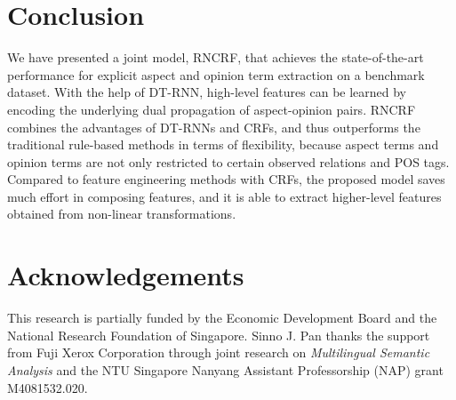 \documentclass[11pt,letterpaper]{article}
\begin{document}
\section{Conclusion}
We have presented a joint model, RNCRF, that achieves the state-of-the-art performance for explicit aspect and opinion term extraction on a benchmark dataset. With the help of DT-RNN, high-level features can be learned by encoding the underlying dual propagation of aspect-opinion pairs. RNCRF combines the advantages of DT-RNNs and CRFs, and thus outperforms the traditional rule-based methods in terms of flexibility, because aspect terms and opinion terms are not only restricted to certain observed relations and POS tags. Compared to feature engineering methods with CRFs, the proposed model saves much effort in composing features, and it is able to extract higher-level features obtained from non-linear transformations.

\section*{Acknowledgements}
This research is partially funded by the Economic Development Board and the National Research Foundation of Singapore. Sinno J. Pan thanks the support from Fuji Xerox Corporation through joint research on {\em Multilingual Semantic Analysis} and the NTU Singapore Nanyang Assistant Professorship (NAP) grant M4081532.020.



\end{document}

